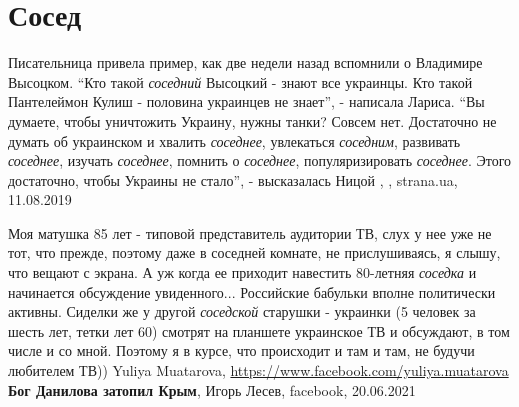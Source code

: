 
 
 
 
 
\chapter{Сосед}

Писательница привела пример, как две недели назад вспомнили о Владимире
Высоцком. \enquote{Кто такой \emph{соседний} Высоцкий - знают все украинцы. Кто
такой Пантелеймон Кулиш - половина украинцев не знает}, - написала Лариса.
\enquote{Вы думаете, чтобы уничтожить Украину, нужны танки? Совсем нет.
Достаточно не думать об украинском и хвалить \emph{соседнее}, увлекаться
\emph{соседним}, развивать \emph{соседнее}, изучать \emph{соседнее}, помнить о
\emph{соседнее}, популяризировать \emph{соседнее}.  Этого достаточно, чтобы
Украины не стало}, - высказалась Ницой
, , strana.ua, 11.08.2019

Моя матушка 85 лет - типовой представитель аудитории ТВ, слух
у нее уже не тот, что прежде, поэтому даже в соседней комнате, не
прислушиваясь, я слышу, что вещают с экрана. А уж когда ее приходит навестить
80-летняя \emph{соседка} и начинается обсуждение увиденного... Российские
бабульки вполне политически активны. Сиделки же у другой \emph{соседской}
старушки - украинки (5 человек за шесть лет, тетки лет 60) смотрят на планшете
украинское ТВ и обсуждают, в том числе и со мной. Поэтому я в курсе, что
происходит и там и там, не будучи любителем ТВ))
Yuliya Muatarova, \url{https://www.facebook.com/yuliya.muatarova}
\textbf{Бог Данилова затопил Крым}, Игорь Лесев, facebook, 20.06.2021
